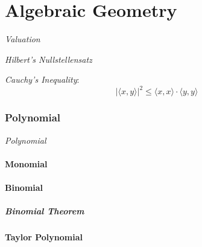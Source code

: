 \part{Algebraic Geometry}\label{sec:algebraic_geometry}

\emph{Valuation}

\emph{Hilbert's Nullstellensatz}

\emph{Cauchy's Inequality}:
\[
    |\langle x,y \rangle|^2 \leq \langle x,x \rangle \cdot \langle
    y,y \rangle
\]



\section{Polynomial}\label{sec:polynomial}

\emph{Polynomial}



\subsection{Monomial}\label{sec:monomial}

\subsection{Binomial}\label{sec:binomial}

\subsubsection{Binomial Theorem}\label{sec:binomial_theorem}



\subsection{Taylor Polynomial}\label{sec:taylor_polynomial}



